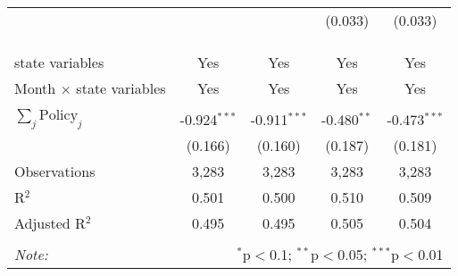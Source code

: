 \begin{tabular}{@{\extracolsep{1pt}}lcccc}
  &  &  & (0.033) & (0.033) \\ 
   &  &  &  &  \\ 
  &  &  &  &  \\ 
 \hline \\[-1.8ex] 
state variables & Yes & Yes & Yes & Yes \\ 
Month $\times$ state variables & Yes & Yes & Yes & Yes \\ 
\hline \\[-1.8ex] 
$\sum_j \mathrm{Policy}_j$ & -0.924$^{***}$ & -0.911$^{***}$ & -0.480$^{**}$ & -0.473$^{***}$ \\ 
 & (0.166) & (0.160) & (0.187) & (0.181) \\ 
Observations & 3,283 & 3,283 & 3,283 & 3,283 \\ 
R$^{2}$ & 0.501 & 0.500 & 0.510 & 0.509 \\ 
Adjusted R$^{2}$ & 0.495 & 0.495 & 0.505 & 0.504 \\ 
\hline 
\hline \\[-1.8ex] 
\textit{Note:}  & \multicolumn{4}{r}{$^{*}$p$<$0.1; $^{**}$p$<$0.05; $^{***}$p$<$0.01} \\ 
\end{tabular} 